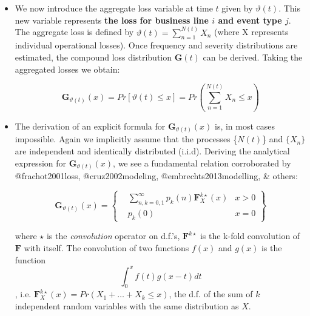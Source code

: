 \documentclass[]{DissertateUSU}
\begin{document}
\begin{itemize}
\item We now introduce the aggregate loss variable at time $t$ given by $\vartheta(t)$. This new variable represents \textbf{the loss for business line $i$ and event type $j$}. The aggregate loss is defined by \begin{math} \vartheta(t) = \sum_{n=1}^{N(t)} X_{n} \end{math} (where X represents individual operational losses). Once frequency and severity distributions are estimated, the compound loss distribution \begin{math} \mathbf{G}(t)\end{math} can be derived.  Taking the aggregated losses we obtain:

\singlespacing
\begin{equation}\label{eqn6}
\mathbf{G}_{\vartheta(t)}(x)=Pr[\vartheta(t)\leq x]=Pr\left(\sum_{n=1}^{N(t)}X_{n} \leq x\right)
\end{equation}
\doublespacing

\item The derivation of an explicit formula for \begin{math}\mathbf{G}_{\vartheta(t)}(x) \end{math} is, in most cases impossible. Again we implicitly assume that the processes \{$N(t)$\} and $\{X_{n}\}$ are independent and identically distributed (i.i.d).  Deriving the analytical expression for \begin{math}\mathbf{G}_{\vartheta(t)}(x) \end{math}, we see a fundamental relation corroborated by @frachot2001loss, @cruz2002modeling, @embrechts2013modelling, \& others:

\singlespacing
\begin{equation}\label{eqn7}
\mathbf {G}_{\vartheta(t)}(x)=\left\{\begin{array}{rcl}
                 &\sum_{n,k=0,1}^{\infty} p_{k}(n)\mathbf{F}_{X}^{k\star}(x) &x>0\\ &p_{k}(0) &x=0
                 \end{array}\right\}
\end{equation}
\doublespacing

where $\star $ is the \emph{convolution} operator on d.f.'s, \begin{math}\mathbf{F}^{k\star} \end{math} is the k-fold convolution of \begin{math}\mathbf{F} \end{math} with itself. The convolution of two functions $f(x)$ and $g(x)$ is the function
\singlespacing
\begin{equation}
\int_{0}^{x}f(t)g(x-t)dt
\end{equation}
\doublespacing , i.e. \begin{math} \mathbf{F}_{X}^{k\star}(x)=Pr(X_1 + \ldots + X_k \leq x) \end{math}, the d.f. of the sum of $k$ independent random variables with the same distribution as $X$. 


\end{itemize}
\end{document}
